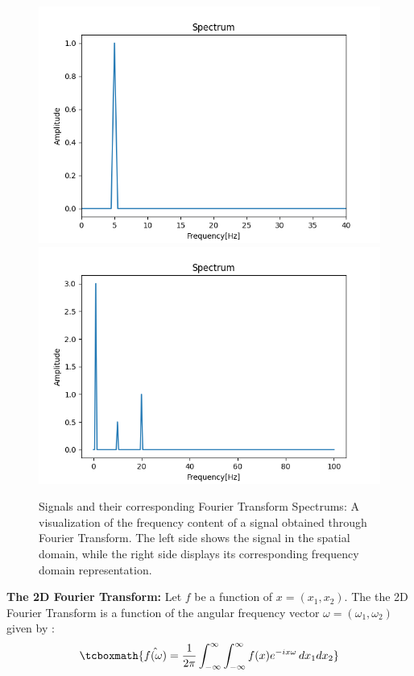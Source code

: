 \documentclass{article}
\begin{document}
\begin{figure}[H]
{\begin{minipage}{0.5\textwidth}
\end{minipage}
\hfill
\begin{minipage}{0.5\textwidth}
	\includegraphics[scale = 0.5]{media/fourier2.png}
	\includegraphics[scale = 0.5]{media/fourier3.png}
\end{minipage}
	}
  \caption{Signals and their corresponding Fourier Transform Spectrums: A visualization of the frequency content of a signal obtained through Fourier Transform.
	\newline 
	The left side shows the signal in the spatial domain, while the right side displays its corresponding frequency domain representation.}
  \label{fig:label}
\end{figure}
\textbf{The 2D Fourier Transform: }
	Let $f$ be a function of $x = (x_1,x_2)$. The the 2D Fourier Transform is a function of the angular frequency vector $\omega = (\omega_{1},\omega_{2})$ given by :
	\begin{equation}	
		\tcboxmath{\hat{f(\omega)} = \frac{1}{2\pi}\int_{-\infty}^{\infty} \int_{-\infty}^{\infty}f(x)e^{-ix\omega} \, dx_{1}dx_{2}}
	\end{equation}
\end{document}
